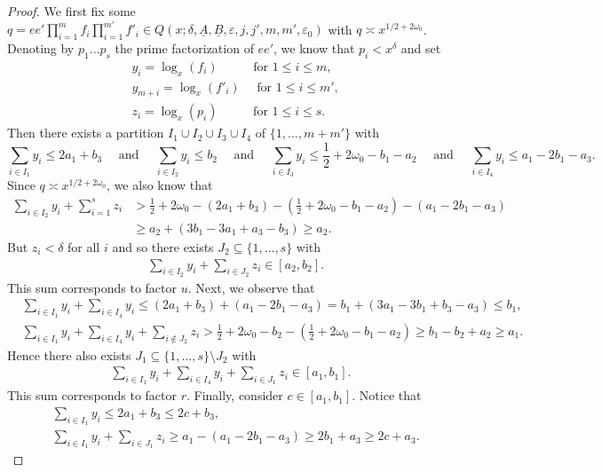 \documentclass{amsart}
\numberwithin{equation}{section}
\begin{document}
\begin{proof} We first fix some $q=e e' \prod_{i=1}^m f_i \prod_{i=1}^{m'} f'_i    \in  Q(x;\delta,\underline{A},\underline{B},\varepsilon,j,j',m,m',\varepsilon_0)$ with $q \asymp x^{1/2+2\omega_0}$.  Denoting by $p_1 \dots p_s$   the prime factorization of $e e'$, we know that  $p_i <x^\delta$  and set
\begin{align*}
&y_i =   \log_x(f_i)  \qquad\,\,\, \mbox{ for } 1 \leq i \leq m, \\
 &y_{m+i} =    \log_x(f'_i)  \quad \mbox{ for } 1 \leq i \leq m', \\
 &z_i = \log_x(p_i)     \qquad \, \,\, \mbox{ for } 1 \leq i \leq s.
\end{align*} 
Then there exists a partition 
$I_1 \cup I_2 \cup I_3 \cup I_4$ of $\{1, \dots, m+m'\}$ with 
$$ \sum_{i \in I_1} y_i \leq 2a_1+b_3 \quad \mbox{ and } \quad  \sum_{i \in I_2} y_i \leq  b_2  
\quad \mbox{ and } \quad  \sum_{i \in I_3} y_i \leq  \frac{1}{2} +2\omega_0 - b_1 -a_2  \quad \mbox{ and } \quad  \sum_{i \in I_4} y_i \leq  a_1 -2b_1-a_3. $$ 
Since $q \asymp x^{1/2+2\omega_0}$, we also know that 
\begin{align*}
 \sum_{i \in I_2}   y_i +  \sum_{i=1}^s z_i &> \tfrac{1}{2}+2 \omega_0-  (2a_1+b_3)- ( \tfrac{1}{2} +2\omega_0 - b_1 -a_2) - (a_1 -2b_1-a_3 ) \\
&\geq a_2  +(3b_1 - 3a_1+a_3 -b_3  )   \geq a_2.
 \end{align*} 
 But $z_i < \delta$ for all $i$  and so there exists $J_2 \subseteq \{1, \dots, s\}$ with  
 \begin{align*}
&\sum_{i \in I_2}   y_i +  \sum_{i \in J_2} z_i \in [a_2,b_2].
 \end{align*} 
This sum corresponds to factor $u$. Next, we observe that 
 \begin{align*}
 &\sum_{i \in I_1}   y_i + \sum_{i \in I_4} y_i \leq (2a_1+b_3 ) +  (  a_1 -2b_1-a_3) = b_1+ (3a_1 -3b_1 + b_3-a_3 )  \leq b_1,
 \\
&\sum_{i \in I_1}   y_i + \sum_{i \in I_4} y_i+ \sum_{i \not\in J_2} z_i > \tfrac{1}{2}+2\omega_0- b_2-   \left(\tfrac{1}{2}+2\omega_0 -b_1 -a_2 \right) \geq  b_1  - b_2 +a_2 \geq  a_1.
\end{align*} 
Hence there also exists $J_1 \subseteq \{1, \dots, s\} \setminus J_2$ with 
\begin{align*}
 \sum_{i \in I_1}   y_i + \sum_{i \in I_4} y_i+ \sum_{i  \in J_1} z_i \in [a_1,b_1].
\end{align*} 
This sum corresponds to factor $r$. 
Finally, consider $c \in [a_1,b_1]$. Notice that 
 \begin{align*}
 &\sum_{i \in I_1}   y_i  \leq 2a_1+b_3  \leq  2c +b_3 ,
 \\
&\sum_{i \in I_1}   y_i +  \sum_{i \in J_1} z_i \geq a_1 - (a_1 -2b_1-a_3) \geq 2b_1 +a_3 \geq 2c+a_3.
\end{align*} 



\end{proof}
\end{document}
